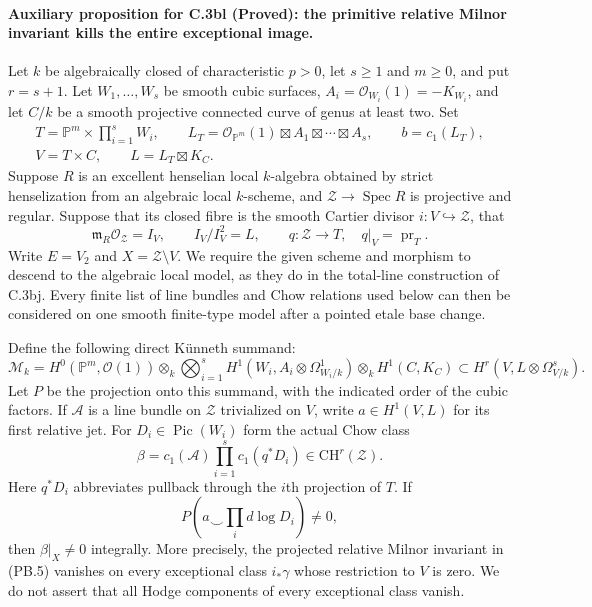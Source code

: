 \paragraph{Auxiliary proposition for C.3bl (Proved):
the primitive relative Milnor invariant kills the entire exceptional image.}
Let $k$ be algebraically closed of characteristic $p>0$, let $s\geq1$
and $m\geq0$, and put $r=s+1$. Let $W_1,\ldots,W_s$ be smooth
cubic surfaces, $A_i=\mathcal O_{W_i}(1)=-K_{W_i}$, and let $C/k$
be a smooth projective connected curve of genus at least two. Set
\[
 \begin{gathered}
 T=\mathbb P^m\times\prod_{i=1}^sW_i,
 \qquad L_T=\mathcal O_{\mathbb P^m}(1)\boxtimes A_1\boxtimes\cdots\boxtimes A_s,
 \qquad b=c_1(L_T),\\
 V=T\times C,\qquad L=L_T\boxtimes K_C.
 \end{gathered}
 \tag{PB.1}
\]
Suppose $R$ is an excellent henselian local $k$-algebra obtained by
strict henselization from an algebraic local $k$-scheme, and
$\mathcal Z\to\operatorname{Spec}R$ is projective and regular.
Suppose that its closed fibre is the smooth Cartier divisor
$i:V\hookrightarrow\mathcal Z$, that
\[
 \mathfrak m_R\mathcal O_{\mathcal Z}=I_V,
 \qquad I_V/I_V^2=L,
 \qquad q:\mathcal Z\longrightarrow T,
 \quad q|_V=\operatorname{pr}_T.
 \tag{PB.2}
\]
Write $E=V_2$ and $X=\mathcal Z\setminus V$. We require the given
scheme and morphism to descend to the algebraic local model, as they
do in the total-line construction of C.3bj. Every finite list of
line bundles and Chow relations used below can then be considered on
one smooth finite-type model after a pointed etale base change.

Define the following direct K\"unneth summand:
\[
 \mathcal M_k=
 H^0(\mathbb P^m,\mathcal O(1))\otimes_k
 \bigotimes_{i=1}^s H^1(W_i,A_i\otimes\Omega^1_{W_i/k})
 \otimes_k H^1(C,K_C)
 \subset H^r(V,L\otimes\Omega^s_{V/k}).
 \tag{PB.3}
\]
Let $P$ be the projection onto this summand, with the indicated order
of the cubic factors. If $\mathcal A$ is a line bundle on $\mathcal Z$
trivialized on $V$, write $a\in H^1(V,L)$ for its first relative jet.
For $D_i\in\operatorname{Pic}(W_i)$ form the actual Chow class
\[
 \beta=c_1(\mathcal A)\prod_{i=1}^s c_1(q^*D_i)
                      \in\mathrm{CH}^{r}(\mathcal Z).
 \tag{PB.4}
\]
Here $q^*D_i$ abbreviates pullback through the $i$th projection of $T$.
If
\[
 P\left(a\smile\prod_i d\log D_i\right)\ne0,
 \tag{PB.5}
\]
then $\beta|_X\ne0$ integrally. More precisely, the projected
relative Milnor invariant in (PB.5) vanishes on every exceptional
class $i_*\gamma$ whose restriction to $V$ is zero. We do not assert
that all Hodge components of every exceptional class vanish.

